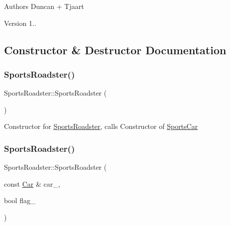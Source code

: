 \begin{DoxyAuthor}{Authors}
Duncan + Tjaart 
\end{DoxyAuthor}
\begin{DoxyVersion}{Version}
1.. 
\end{DoxyVersion}


\subsection{Constructor \& Destructor Documentation}
\mbox{\label{class_sports_roadster_a649c7193525cf0f80f2f0866d8af809d}} 
\subsubsection{\texorpdfstring{Sports\+Roadster()}{SportsRoadster()}\hspace{0.1cm}{\footnotesize\ttfamily [1/2]}}
{\footnotesize\ttfamily Sports\+Roadster\+::\+Sports\+Roadster (\begin{DoxyParamCaption}{ }\end{DoxyParamCaption})\hspace{0.3cm}{\ttfamily [inline]}}

Constructor for \mbox{\hyperlink{class_sports_roadster}{Sports\+Roadster}}, calls Constructor of \mbox{\hyperlink{class_sports_car}{Sports\+Car}} \mbox{\label{class_sports_roadster_af330cc2ea66c502e707322cb4270a63b}} 
\subsubsection{\texorpdfstring{Sports\+Roadster()}{SportsRoadster()}\hspace{0.1cm}{\footnotesize\ttfamily [2/2]}}
{\footnotesize\ttfamily Sports\+Roadster\+::\+Sports\+Roadster (\begin{DoxyParamCaption}\item[{const \mbox{\hyperlink{class_car}{Car}} \&}]{car\+\_\+,  }\item[{bool}]{flag\+\_\+ }\end{DoxyParamCaption})\hspace{0.3cm}{\ttfamily [inline]}}

